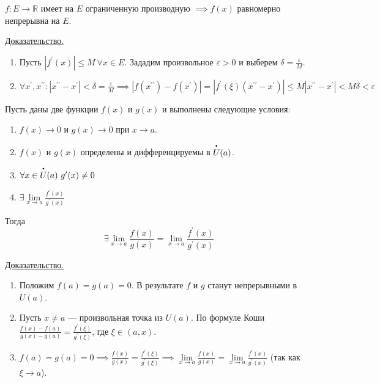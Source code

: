 \documentclass{article}
\begin{document}
\begin{theorem}
    \(f: E \to \mathbb{R}\) имеет на \(E\) ограниченную производную \(\implies f(x)\) равномерно непрерывна на \(E\). 
\end{theorem}
\noindent \underline{Доказательство.}
\begin{enumerate}
    \item Пусть \(\left\vert f^{\prime}(x) \right\vert \leq M\ \forall x \in E\). Зададим произвольное \(\varepsilon > 0\) и выберем \(\displaystyle \delta = \frac{\varepsilon}{M}\). 
    \item \(\displaystyle \forall x^{\prime}, x^{\prime\prime}: \left\vert x^{\prime\prime} - x^{\prime} \right\vert < \delta = \frac{\varepsilon}{M} \implies \left\vert f(x^{\prime\prime}) - f(x^{\prime}) \right\vert = \left\vert f^{\prime}(\xi)(x^{\prime\prime} - x^{\prime}) \right\vert \leq M\left\vert x^{\prime\prime} - x^{\prime} \right\vert < M \delta < \varepsilon\) 
\end{enumerate}

\begin{theorem}
    Пусть даны две функции \(f(x)\) и \(g(x)\) и выполнены следующие условия:
    \begin{enumerate}
        \item \(f(x) \to 0\) и \(g(x) \to 0\) при \(x \to a\).
        \item \(f(x)\) и \(g(x)\) определены и дифференцируемы в \(\overset{\dt}{U}(a)\).
        \item \(\forall x \in \overset{\dt}{U}(a)\ g^{\prime}(x) \neq 0\)
        \item \(\displaystyle \exists \lim\limits_{x \to a} \frac{f^{\prime}(x)}{g^{\prime}(x)}\) 
    \end{enumerate} 
    Тогда \[\exists \lim\limits_{x \to a} \frac{f(x)}{g(x)} = \lim\limits_{x \to a} \frac{f^{\prime}(x)}{g^{\prime}(x)}\] 
\end{theorem}
\noindent \underline{Доказательство.}
\begin{enumerate}
    \item Положим \(f(a) = g(a) = 0\). В результате \(f\) и \(g\) станут непрерывными в \(U(a)\).   
    \item Пусть \(x \neq a\) --- произвольная точка из \(U(a)\). По формуле Коши \(\displaystyle \frac{f(x) - f(a)}{g(x) - g(a)} = \frac{f^{\prime}(\xi)}{g^{\prime}(\xi)}\), где \(\xi \in (a, x)\).
    \item \(\displaystyle f(a) = g(a) = 0 \implies \frac{f(x)}{g(x)} = \frac{f^{\prime}(\xi)}{g^{\prime}(\xi)} \implies \lim\limits_{x \to a} \frac{f(x)}{g(x)} = \lim\limits_{x \to a} \frac{f^{\prime}(x)}{g^{\prime}(x)}\) (так как \(\xi \to a\)).
\end{enumerate}
\end{document}
